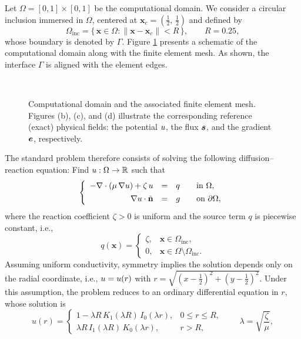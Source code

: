Let  $\Omega = [0,1]\times[0,1]$ be the computational domain.
We consider a circular inclusion immersed in $\Omega$, centered at $\mathbf{x}_{c} = (\frac12,\,\frac12)$ and defined by
$$
\Omega_{\mathrm{inc}} = \{\, \mathbf{x}\in \Omega : \|\mathbf{x}-\mathbf{x}_{c}\| < R \,\},
\qquad R=0.25,
$$
whose boundary is denoted by $\Gamma$. 
Figure \ref{fig:inclusion_mesh_exact_fields} presents a schematic of the computational domain along with the finite element mesh. As shown, the interface $\Gamma$ is aligned with the element edges. 
\begin{figure}[h!]
	\centering
	\caption{Computational domain and the associated finite element mesh. Figures (b), (c), and (d) illustrate the corresponding reference (exact) physical fields: the potential $u$, the flux $\bm{s}$, and the gradient $\bm{e}$, respectively.}
	~\\
	\fontsize{12pt}{10pt}\selectfont 
	\def\svgwidth{0.9\columnwidth}
	
	\label{fig:inclusion_mesh_exact_fields}
\end{figure}
The standard problem therefore consists of solving the following diffusion–reaction equation:
Find $u:\Omega \to \mathbb{R}$ such that
\begin{equation}
	\left\lbrace
	\begin{array}{rcll}
		-\nabla \cdot (\mu\,\nabla u)+ \zeta\, u &=& q
		&\quad \text{in } \Omega, \\[4pt]
		\nabla u \cdot \check{\mathbf{n}} &=& g 
		&\quad \text{on } \partial\Omega,
	\end{array}
	\right.
	\label{eq:diff_reaction}
\end{equation}
where the reaction coefficient $\zeta > 0$ is uniform and the source term $q$ 
is piecewise constant, i.e.,
$$
q(\mathbf{x}) =
\begin{cases}
	\zeta, & \mathbf{x}\in \Omega_{\mathrm{inc}}, \\[3pt]
	0, & \mathbf{x}\in \Omega\setminus \Omega_{\mathrm{inc}}.
\end{cases}
$$
Assuming uniform conductivity, symmetry implies the solution depends only on the radial coordinate, i.e., $u = u(r)$ with $r = \sqrt{(x-\frac12)^{2} + (y-\frac12)^{2}}$. Under this assumption, the problem reduces to an ordinary differential equation in $r$, whose solution is
\begin{equation}
	u(r) =
	\begin{cases}
		\displaystyle
		1 - \lambda R\,K_{1}(\lambda R)\,I_{0}(\lambda r),
		& 0 \le r \le R, \\[10pt]
		\displaystyle
		\lambda R\,I_{1}(\lambda R)\,K_{0}(\lambda r),
		& r > R,
	\end{cases}
	\qquad
	\lambda = \sqrt{\frac{\zeta}{\mu}},
\end{equation}

